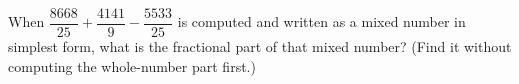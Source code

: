 When $\dfrac{8668}{25}+\dfrac{4141}{9}-\dfrac{5533}{25}$ is computed and written as a mixed number in simplest form, what is the fractional part of that mixed number? (Find it without computing the whole-number part first.)
